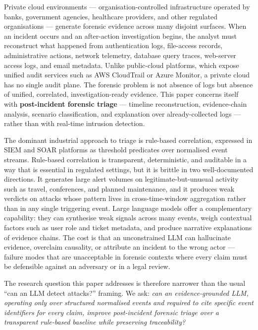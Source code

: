 \documentclass[conference]{IEEEtran}
\begin{document}
Private cloud environments --- organisation-controlled infrastructure operated by banks, government agencies, healthcare providers, and other regulated organisations --- generate forensic evidence across many disjoint surfaces. When an incident occurs and an after-action investigation begins, the analyst must reconstruct what happened from authentication logs, file-access records, administrative actions, network telemetry, database query traces, web-server access logs, and email metadata. Unlike public-cloud platforms, which expose unified audit services such as AWS CloudTrail or Azure Monitor, a private cloud has no single audit plane. The forensic problem is not absence of logs but absence of unified, correlated, investigation-ready evidence. This paper concerns itself with \textbf{post-incident forensic triage} --- timeline reconstruction, evidence-chain analysis, scenario classification, and explanation over already-collected logs --- rather than with real-time intrusion detection.

The dominant industrial approach to triage is rule-based correlation, expressed in SIEM and SOAR platforms as threshold predicates over normalised event streams. Rule-based correlation is transparent, deterministic, and auditable in a way that is essential in regulated settings, but it is brittle in two well-documented directions. It generates large alert volumes on legitimate-but-unusual activity such as travel, conferences, and planned maintenance, and it produces weak verdicts on attacks whose pattern lives in cross-time-window aggregation rather than in any single triggering event. Large language models offer a complementary capability: they can synthesise weak signals across many events, weigh contextual factors such as user role and ticket metadata, and produce narrative explanations of evidence chains. The cost is that an unconstrained LLM can hallucinate evidence, overclaim causality, or attribute an incident to the wrong actor --- failure modes that are unacceptable in forensic contexts where every claim must be defensible against an adversary or in a legal review.

The research question this paper addresses is therefore narrower than the usual ``can an LLM detect attacks?'' framing. We ask: \emph{can an evidence-grounded LLM, operating only over structured normalised events and required to cite specific event identifiers for every claim, improve post-incident forensic triage over a transparent rule-based baseline while preserving traceability?}
\end{document}
